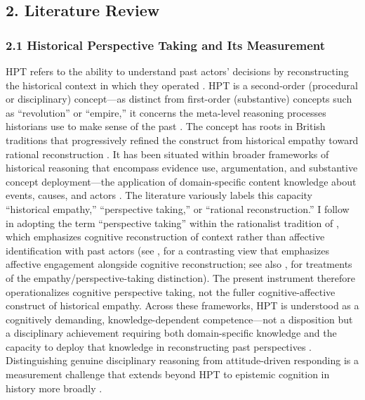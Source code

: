 \documentclass[
  12pt,
]{article}
\begin{document}
\hypertarget{literature-review}{%
\subsection{2. Literature Review}\label{literature-review}}

\hypertarget{historical-perspective-taking-and-its-measurement}{%
\subsubsection{2.1 Historical Perspective Taking and Its Measurement}\label{historical-perspective-taking-and-its-measurement}}

HPT refers to the ability to understand past actors' decisions by
reconstructing the historical context in which they operated \citep{Hartmann_Hasselhorn2008Historical,Lee_Ashby2001Empathy}. HPT is a second-order
(procedural or disciplinary) concept---as distinct from first-order
(substantive) concepts such as ``revolution'' or ``empire,'' it
concerns the meta-level reasoning processes historians use to make
sense of the past \citep{Seixas_Peck2004Teaching}. The concept has roots in
British traditions that progressively refined the construct from
historical empathy \citep{Ashby1987,Shemilt1984} toward
rational reconstruction \citep{Lee_Ashby2001Empathy}. It has been situated
within broader frameworks of historical reasoning that encompass
evidence use, argumentation, and substantive concept deployment---the
application of domain-specific content knowledge about events, causes,
and actors \citep{vanBoxtel_vanDrie2018Historical,VanDrie_VanBoxtel2008Historical,VanSledright2014Assessing}. The literature variously labels this
capacity ``historical empathy,'' ``perspective taking,'' or ``rational
reconstruction.'' I follow \citet{Hartmann_Hasselhorn2008Historical} in adopting
the term ``perspective taking'' within the rationalist tradition of
\citet{Lee_Ashby2001Empathy}, which emphasizes cognitive reconstruction of
context rather than affective identification with past actors (see
\citealp{Barton_Levstik2004Teaching}, for a contrasting view that emphasizes
affective engagement alongside cognitive reconstruction; see also
\citealp{Endacott_Brooks2013An_Updated,Endacott2014Negotiating}, for
treatments of the empathy/perspective-taking distinction). The present
instrument therefore operationalizes cognitive perspective taking, not
the fuller cognitive-affective construct of historical empathy. Across these frameworks, HPT
is understood as a cognitively demanding, knowledge-dependent
competence---not a disposition but a disciplinary achievement requiring
both domain-specific knowledge and the capacity to deploy that
knowledge in reconstructing past perspectives \citep{Chapman2021Introduction,VanSledright2014Assessing,Wineburg2001Historical}. Distinguishing genuine
disciplinary reasoning from attitude-driven responding is a
measurement challenge that extends beyond HPT to epistemic cognition in
history more broadly \citep{Maggioni_et_al2009Walking}.
\end{document}
